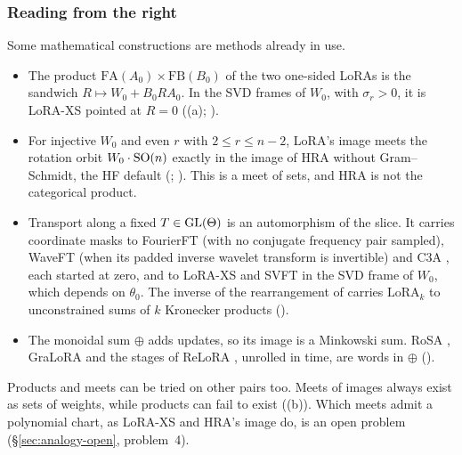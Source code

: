 \subsubsection{Reading from the right}\label{sec:rosetta-reverse}

Some mathematical constructions are methods already in use.
\begin{itemize}
  \item The product $\mathrm{FA}(A_0)\times\mathrm{FB}(B_0)$ of the two one-sided LoRAs is the sandwich
    $R\mapsto W_0+B_0RA_0$. In the SVD frames of $W_0$, with $\sigma_r>0$, it is LoRA-XS pointed at $R=0$
    ((a); \citealp{baazy2024lora}).
  \item For injective $W_0$ and even $r$ with $2\le r\le n-2$, LoRA's image meets the rotation orbit $W_0\cdot\mathrm{SO}(n)$
    exactly in the image of HRA without Gram--Schmidt, the HF default (;
    \citealp{yuan2024bridging}). This is a meet of sets, and HRA is not the categorical product.
  \item Transport along a fixed $T\in\mathrm{GL}(\Theta)$ is an automorphism of the slice. It carries coordinate masks to
    FourierFT \citep{gao2024parameter} (with no conjugate frequency pair sampled), WaveFT \citep{bilican2025exploring}
    (when its padded inverse wavelet transform is invertible) and C3A \citep{chen2024parameter}, each started at zero,
    and to LoRA-XS and SVFT \citep{lingam2024svft} in the SVD frame of $W_0$, which depends on $\theta_0$. The inverse
    of the rearrangement of \citet{loan1993approximation} carries $\mathrm{LoRA}_k$ to unconstrained sums of $k$
    Kronecker products ().
  \item The monoidal sum $\oplus$ adds updates, so its image is a Minkowski sum. RoSA \citep{nikdan2024rosa}, GraLoRA
    \citep{jung2025gralora} and the stages of ReLoRA \citep{lialin2023relora}, unrolled in time, are words in $\oplus$
    ().
\end{itemize}

\begin{explains}
Products and meets can be tried on other pairs too. Meets of images always exist as sets of weights, while products can
fail to exist ((b)). Which meets admit a polynomial chart, as LoRA-XS and HRA's image do, is an
open problem (\S\ref{sec:analogy-open}, problem~4).
\end{explains}


